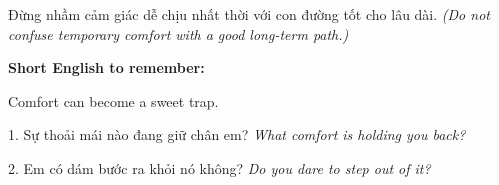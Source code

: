 \begin{baihoc}
Đừng nhầm cảm giác dễ chịu nhất thời với con đường tốt cho lâu dài.
\textit{(Do not confuse temporary comfort with a good long-term path.)}
\end{baihoc}

\begin{ghinhoanh}
\textbf{Short English to remember:}

Comfort can become a sweet trap.

\end{ghinhoanh}

\begin{tuhocnhanh}
1. Sự thoải mái nào đang giữ chân em? \textit{What comfort is holding you back?}

2. Em có dám bước ra khỏi nó không? \textit{Do you dare to step out of it?}
\end{tuhocnhanh}
\ngancach